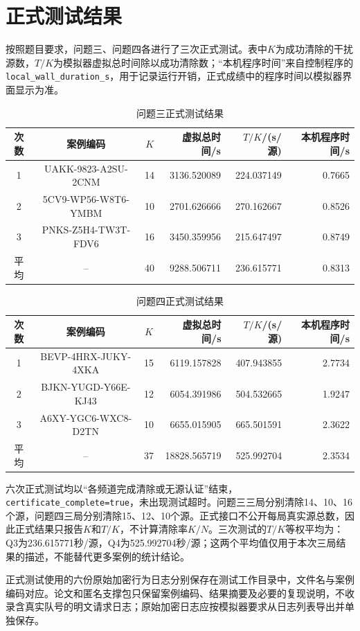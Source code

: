 \section{正式测试结果}
\label{sec:formal-results}
按照题目要求，问题三、问题四各进行了三次正式测试。表中$K$为成功清除的干扰源数，$T/K$为模拟器虚拟总时间除以成功清除数；“本机程序时间”来自控制程序的\texttt{local\_wall\_duration\_s}，用于记录运行开销，正式成绩中的程序时间以模拟器界面显示为准。

\begin{table}[H]
\centering\small
\caption{问题三正式测试结果}
\label{tab:formal-q3}
\begin{tabular}{c c c r r r}
\toprule
次数 & 案例编码 & $K$ & 虚拟总时间/s & $T/K$/(s/源) & 本机程序时间/s\\
\midrule
1 & UAKK-9823-A2SU-2CNM & 14 & 3136.520089 & 224.037149 & 0.7665\\
2 & 5CV9-WP56-W8T6-YMBM & 10 & 2701.626666 & 270.162667 & 0.8526\\
3 & PNKS-Z5H4-TW3T-FDV6 & 16 & 3450.359956 & 215.647497 & 0.8749\\
\midrule
平均 & -- & 40 & 9288.506711 & 236.615771 & 0.8313\\
\bottomrule
\end{tabular}
\end{table}

\begin{table}[H]
\centering\small
\caption{问题四正式测试结果}
\label{tab:formal-q4}
\begin{tabular}{c c c r r r}
\toprule
次数 & 案例编码 & $K$ & 虚拟总时间/s & $T/K$/(s/源) & 本机程序时间/s\\
\midrule
1 & BEVP-4HRX-JUKY-4XKA & 15 & 6119.157828 & 407.943855 & 2.7734\\
2 & BJKN-YUGD-Y66E-KJ43 & 12 & 6054.391986 & 504.532665 & 1.9247\\
3 & A6XY-YGC6-WXC8-D2TN & 10 & 6655.015905 & 665.501591 & 2.3622\\
\midrule
平均 & -- & 37 & 18828.565719 & 525.992704 & 2.3534\\
\bottomrule
\end{tabular}
\end{table}

\begin{sloppypar}
六次正式测试均以“各频道完成清除或无源认证”结束，\texttt{certificate\_complete=true}，未出现测试超时。问题三三局分别清除14、10、16个源，问题四三局分别清除15、12、10个源。正式接口不公开每局真实源总数，因此正式结果只报告$K$和$T/K$，不计算清除率$K/N$。三次测试的$T/K$等权平均为：Q3为236.615771秒/源，Q4为525.992704秒/源；这两个平均值仅用于本次三局结果的描述，不能替代更多案例的统计结论。
\end{sloppypar}

正式测试使用的六份原始加密行为日志分别保存在测试工作目录中，文件名与案例编码对应。论文和匿名支撑包只保留案例编码、结果摘要及必要的复现说明，不收录含真实队号的明文请求日志；原始加密日志应按模拟器要求从日志列表导出并单独保存。
